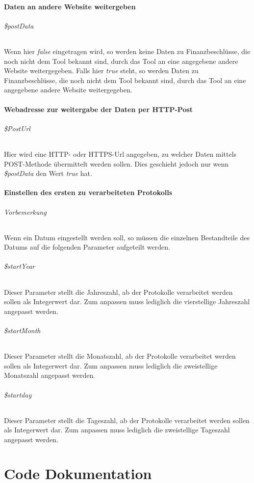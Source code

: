 \documentclass[12pt,parskip=full, pagea4]{scrartcl}
\begin{document}
	\subsection{Daten an andere Website weitergeben}
	\paragraph{\$postData} Wenn hier \textit{false} eingetragen wird, so werden keine Daten zu Finanzbeschlüsse, die noch nicht dem Tool bekannt sind, durch das Tool an eine angegebene andere Website weitergegeben. Falls hier \textit{true} steht, so werden Daten zu Finanzbeschlüsse, die noch nicht dem Tool bekannt sind, durch das Tool an eine angegebene andere Website weitergegeben.
	
	\subsection{Webadresse zur weitergabe der Daten per HTTP-Post}
	\paragraph{\$PostUrl} Hier wird eine HTTP- oder HTTPS-Url angegeben, zu welcher Daten mittels POST-Methode übermittelt werden sollen. Dies geschieht jedoch nur wenn \textit{\$postData} den Wert \textit{true} hat.
	
	\subsection{Einstellen des ersten zu verarbeiteten Protokolls}
	\paragraph{Vorbemerkung} Wenn ein Datum eingestellt werden soll, so müssen die einzelnen Bestandteile des Datums auf die folgenden Parameter aufgeteilt werden.
	\paragraph{\$startYear} Dieser Parameter stellt die Jahreszahl, ab der Protokolle verarbeitet werden sollen als Integerwert dar. Zum anpassen muss lediglich die vierstellige Jahreszahl angepasst werden.
	\paragraph{\$startMonth} Dieser Parameter stellt die Monatszahl, ab der Protokolle verarbeitet werden sollen als Integerwert dar. Zum anpassen muss lediglich die zweistellige Monatszahl angepasst werden.
	\paragraph{\$startday} Dieser Parameter stellt die Tageszahl, ab der Protokolle verarbeitet werden sollen als Integerwert dar. Zum anpassen muss lediglich die zweistellige Tageszahl angepasst werden.
		
	\part{Code Dokumentation}
	
\end{document}
